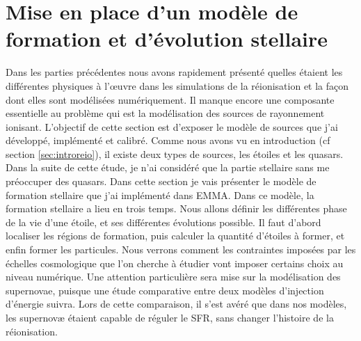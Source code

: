 \chapter{Mise en place d'un modèle de formation et d'évolution stellaire}
\label{sec:etoiles}

Dans les parties précédentes nous avons rapidement présenté quelles étaient les différentes physiques à l’œuvre dans les simulations de la réionisation et la façon dont elles sont modélisées numériquement.
Il manque encore une composante essentielle au problème qui est la modélisation des sources de rayonnement ionisant.
L'objectif de cette section est d'exposer le modèle de sources que j'ai développé, implémenté et calibré.
Comme nous avons vu en introduction (cf section \ref{sec:introreio}), il existe deux types de sources, les étoiles et les quasars.
Dans la suite de cette étude, je n'ai considéré que la partie stellaire sans me préoccuper des quasars.
Dans cette section je vais présenter le modèle de formation stellaire que j'ai implémenté dans EMMA.
Dans ce modèle, la formation stellaire a lieu en trois temps.
Nous allons définir les différentes phase de la vie d'une étoile, et ses différentes évolutions possible.
Il faut d'abord localiser les régions de formation, puis calculer la quantité d'étoiles à former, et enfin former les particules.
Nous verrons comment les contraintes imposées par les échelles cosmologique que l'on cherche à étudier vont imposer certains choix au niveau numérique.
Une attention particulière sera mise sur la modélisation des supernovae, puisque une étude comparative entre deux modèles d'injection d'énergie suivra.
Lors de cette comparaison, il s'est avéré que dans nos modèles, les supernovæ étaient capable de réguler le \ac{SFR}, sans changer l'histoire de la réionisation.

%


